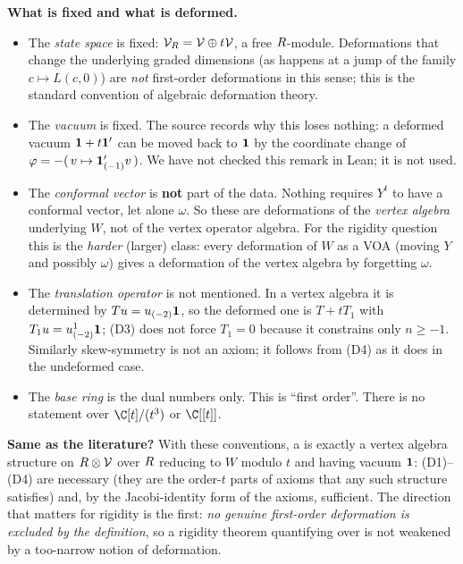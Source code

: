 \begin{dictionary}
\textbf{What is fixed and what is deformed.}
\begin{itemize}
\item The \emph{state space} is fixed: $\mathcal{V}_R = \mathcal{V}\oplus t\mathcal{V}$, a free $R$-module.
  Deformations that change the underlying graded dimensions (as happens at a jump of the family
  $c\mapsto L(c,0)$) are \emph{not} first-order deformations in this sense; this is the standard
  convention of algebraic deformation theory.
\item The \emph{vacuum} is fixed. The source records why this loses nothing: a deformed vacuum
  $\mathbf{1} + t\mathbf{1}'$ can be moved back to $\mathbf{1}$ by the coordinate change of
  $\varphi = -(\,v\mapsto\mathbf{1}'_{(-1)}v\,)$. We have not checked this remark in Lean; it is not
  used.
\item The \emph{conformal vector} is \textbf{not} part of the data. Nothing requires $Y^t$ to have
  a conformal vector, let alone $\omega$. So these are deformations of the \emph{vertex algebra}
  underlying $W$, not of the vertex operator algebra. For the rigidity question this is the
  \emph{harder} (larger) class: every deformation of $W$ as a VOA (moving $Y$ and possibly $\omega$)
  gives a deformation of the vertex algebra by forgetting $\omega$.
\item The \emph{translation operator} is not mentioned. In a vertex algebra it is determined by
  $Tu = u_{(-2)}\mathbf{1}$, so the deformed one is $T + tT_1$ with $T_1u = u^1_{(-2)}\mathbf{1}$;
  (D3) does not force $T_1 = 0$ because it constrains only $n\ge-1$. Similarly skew-symmetry is not
  an axiom; it follows from (D4) as it does in the undeformed case.
\item The \emph{base ring} is the dual numbers only. This is ``first order''. There is no
  statement over $\C[t]/(t^3)$ or $\C[[t]]$.
\end{itemize}

\textbf{Same as the literature?} With these conventions, a  is exactly
a vertex algebra structure on $R\otimes\mathcal{V}$ over $R$ reducing to $W$ modulo $t$ and
having vacuum $\mathbf{1}$: (D1)--(D4) are necessary (they are the order-$t$ parts of axioms that any
such structure satisfies) and, by the Jacobi-identity form of the axioms, sufficient. The
direction that matters for rigidity is the first: \emph{no genuine first-order deformation is
excluded by the definition}, so a rigidity theorem quantifying over 
is not weakened by a too-narrow notion of deformation.
\end{dictionary}

